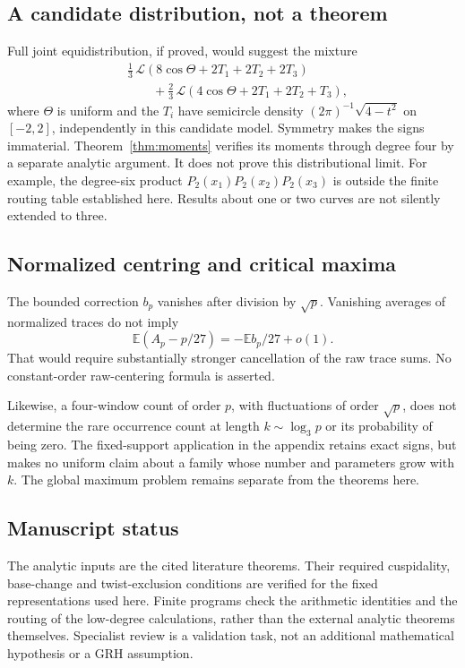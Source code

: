 \documentclass[11pt]{article}
\theoremstyle{definition}\newtheorem{definition}[theorem]{Definition}
\newcommand{\E}{\mathbb E}
\begin{document}
\subsection{A candidate distribution, not a theorem}
Full joint equidistribution, if proved,
would suggest the mixture
\begin{align*}
 &\frac13\,\mathcal L(8\cos\Theta+2T_1+2T_2+2T_3)\\
 &\qquad+\frac23\,\mathcal L(4\cos\Theta+2T_1+2T_2+T_3),
\end{align*}
where $\Theta$ is uniform and the $T_i$
have semicircle density
$(2\pi)^{-1}\sqrt{4-t^2}$ on $[-2,2]$,
independently in this candidate model.
Symmetry makes the signs immaterial.
Theorem~\ref{thm:moments} verifies its
moments through degree four by a
separate analytic argument. It does
not prove this distributional limit.
For example, the degree-six product
$P_2(x_1)P_2(x_2)P_2(x_3)$ is outside
the finite routing table established
here. Results about one or two curves
are not silently extended to three.

\subsection{Normalized centring and critical maxima}
The bounded correction $b_p$ vanishes
after division by $\sqrt p$.
Vanishing averages of normalized
traces do not imply
\[
 \E(A_p-p/27)=-\E b_p/27+o(1).
\]
That would require substantially
stronger cancellation of the raw
trace sums. No constant-order
raw-centering formula is asserted.

Likewise, a four-window count of
order $p$, with fluctuations of order
$\sqrt p$, does not determine the
rare occurrence count at length
$k\sim\log_3p$ or its probability
of being zero. The fixed-support
application in the appendix retains
exact signs, but makes no uniform
claim about a family whose number
and parameters grow with $k$.
The global maximum problem remains
separate from the theorems here.

\subsection{Manuscript status}
The analytic inputs are the cited literature theorems. Their required
cuspidality, base-change and twist-exclusion conditions are verified for
the fixed representations used here. Finite programs check the arithmetic
identities and the routing of the low-degree calculations, rather than
the external analytic theorems themselves. Specialist review is a
validation task, not an additional mathematical hypothesis or a GRH
assumption.
\end{document}
